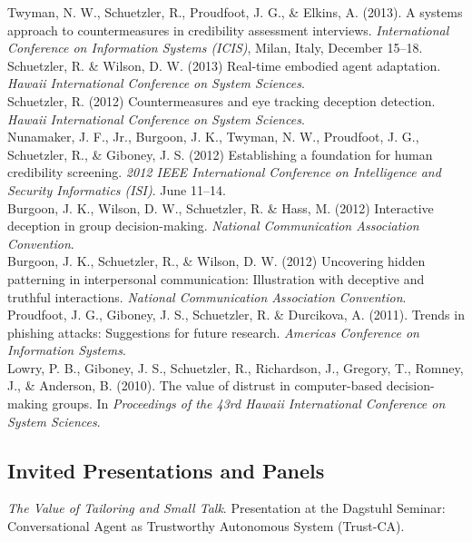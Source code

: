 \documentclass[10pt, letter]{article}
\newcommand{\years}[1]{\marginnote{\scriptsize #1}}
\begin{document}
\years{2013}Twyman, N. W., Schuetzler, R., Proudfoot, J. G., \& Elkins,
A. (2013). A systems approach to countermeasures in credibility assessment
interviews. \emph{International Conference on Information Systems (ICIS)},
Milan, Italy, December 15--18.\\

Schuetzler, R. \& Wilson, D. W. (2013) Real-time embodied agent
adaptation. \emph{Hawaii International Conference on System Sciences}.\\


\years{2012}Schuetzler, R. (2012) Countermeasures and eye tracking deception
detection. \emph{Hawaii International Conference on System Sciences}.\\

Nunamaker, J. F., Jr., Burgoon, J. K., Twyman, N. W., Proudfoot, J. G.,
Schuetzler, R., \& Giboney, J. S. (2012) Establishing a foundation for human
credibility screening. \emph{2012 IEEE International Conference on Intelligence	and Security Informatics (ISI)}. June 11--14.\\

Burgoon, J. K., Wilson, D. W., Schuetzler, R. \& Hass, M. (2012) Interactive
deception in group decision-making. \emph{National Communication Association
	Convention}.\\

Burgoon, J. K., Schuetzler, R., \& Wilson, D. W. (2012) Uncovering hidden
patterning in interpersonal communication: Illustration with deceptive and
truthful interactions. \emph{National Communication Association Convention}.\\

\years{2011}Proudfoot, J. G., Giboney, J. S., Schuetzler, R. \& Durcikova,
A. (2011). Trends in phishing attacks: Suggestions for future
research. \emph{Americas Conference on Information Systems}.\\

\years{2010}Lowry, P. B., Giboney, J. S., Schuetzler, R., Richardson, J.,
Gregory, T., Romney, J., \& Anderson, B. (2010). The value of distrust in
computer-based decision-making groups. In \emph{Proceedings of the 43rd Hawaii
International Conference on System Sciences}.


\subsection*{Invited Presentations and Panels}
\noindent
\years{2021}\emph{The Value of Tailoring and Small Talk}. Presentation at the Dagstuhl Seminar: Conversational Agent as Trustworthy Autonomous System (Trust-CA).\\
\end{document}
